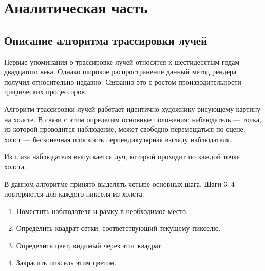 \chapter{Аналитическая часть}

\section{Описание алгоритма трассировки лучей}
Первые упоминания о трассировке лучей относятся к шестидесятым годам двадцатого века. Однако широкое распространение данный метод рендера получил относительно недавно. Связанно это с ростом производительности графических процессоров.

Алгоритм трассировки лучей работает идентично художнику рисующему картину на холсте. В связи с этим определим основные положения: наблюдатель --- точка, из которой проводится наблюдение, может свободно перемещаться по сцене; холст --- бесконечная плоскость перпендикулярная взгляду наблюдателя.

Из глаза наблюдателя выпускается луч, который проходит по каждой точке холста.

В данном алгоритме принято выделять четыре основных шага. Шаги 3--4 повторяются для каждого пикселя из холста.
\begin{enumerate}
	\item Поместить наблюдателя и рамку в необходимое место. 
	\item Определить квадрат сетки, соответствующий текущему пикселю.
	\item Определить цвет, видимый через этот квадрат.
	\item Закрасить пиксель этим цветом.
\end{enumerate}

